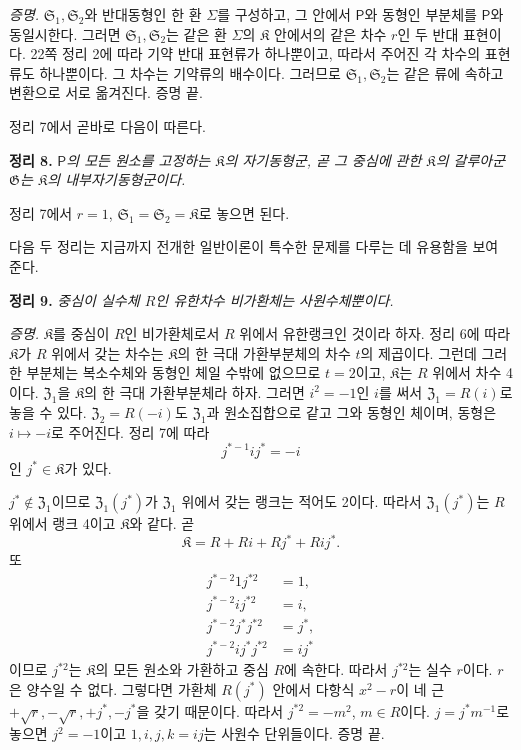 \emph{증명.} \(\mathfrak S_1,\mathfrak S_2\)와 반대동형인 한 환 \(\Sigma\)를 구성하고, 그 안에서 \(\mathsf P\)와 동형인 부분체를 \(\mathsf P\)와 동일시한다. 그러면 \(\mathfrak S_1,\mathfrak S_2\)는 같은 환 \(\Sigma\)의 \(\mathfrak K\) 안에서의 같은 차수 \(r\)인 두 반대 표현이다. 22쪽 정리 2에 따라 기약 반대 표현류가 하나뿐이고, 따라서 주어진 각 차수의 표현류도 하나뿐이다. 그 차수는 기약류의 배수이다. 그러므로 \(\mathfrak S_1,\mathfrak S_2\)는 같은 류에 속하고 변환으로 서로 옮겨진다. 증명 끝.

정리 7에서 곧바로 다음이 따른다.

\textbf{정리 8.} \emph{\(\mathsf P\)의 모든 원소를 고정하는 \(\mathfrak K\)의 자기동형군, 곧 그 중심에 관한 \(\mathfrak K\)의 갈루아군 \(\mathfrak G\)는 \(\mathfrak K\)의 내부자기동형군이다.}

정리 7에서 \(r=1\), \(\mathfrak S_1=\mathfrak S_2=\mathfrak K\)로 놓으면 된다.

다음 두 정리는 지금까지 전개한 일반이론이 특수한 문제를 다루는 데 유용함을 보여 준다.

\textbf{정리 9.} \emph{중심이 실수체 \(R\)인 유한차수 비가환체는 사원수체뿐이다.}

\emph{증명.} \(\mathfrak K\)를 중심이 \(R\)인 비가환체로서 \(R\) 위에서 유한랭크인 것이라 하자. 정리 6에 따라 \(\mathfrak K\)가 \(R\) 위에서 갖는 차수는 \(\mathfrak K\)의 한 극대 가환부분체의 차수 \(t\)의 제곱이다. 그런데 그러한 부분체는 복소수체와 동형인 체일 수밖에 없으므로 \(t=2\)이고, \(\mathfrak K\)는 \(R\) 위에서 차수 4이다. \(\mathfrak Z_1\)을 \(\mathfrak K\)의 한 극대 가환부분체라 하자. 그러면 \(i^2=-1\)인 \(i\)를 써서 \(\mathfrak Z_1=R(i)\)로 놓을 수 있다. \(\mathfrak Z_2=R(-i)\)도 \(\mathfrak Z_1\)과 원소집합으로 같고 그와 동형인 체이며, 동형은 \(i\mapsto-i\)로 주어진다. 정리 7에 따라
\[
        j^{*-1}ij^*=-i
\]
인 \(j^*\in\mathfrak K\)가 있다.

\(j^*\notin\mathfrak Z_1\)이므로 \(\mathfrak Z_1(j^*)\)가 \(\mathfrak Z_1\) 위에서 갖는 랭크는 적어도 2이다. 따라서 \(\mathfrak Z_1(j^*)\)는 \(R\) 위에서 랭크 4이고 \(\mathfrak K\)와 같다. 곧
\[
        \mathfrak K
        =R+Ri+Rj^*+Rij^*.
\]
또
\[
\begin{aligned}
j^{*-2}1j^{*2}&=1,\\
j^{*-2}ij^{*2}&=i,\\
j^{*-2}j^*j^{*2}&=j^*,\\
j^{*-2}ij^*j^{*2}&=ij^*
\end{aligned}
\]
이므로 \(j^{*2}\)는 \(\mathfrak K\)의 모든 원소와 가환하고 중심 \(R\)에 속한다. 따라서 \(j^{*2}\)는 실수 \(r\)이다. \(r\)은 양수일 수 없다. 그렇다면 가환체 \(R(j^*)\) 안에서 다항식 \(x^2-r\)이 네 근 \(+\sqrt r,-\sqrt r,+j^*,-j^*\)을 갖기 때문이다. 따라서 \(j^{*2}=-m^2\), \(m\in R\)이다. \(j=j^*m^{-1}\)로 놓으면 \(j^2=-1\)이고 \(1,i,j,k=ij\)는 사원수 단위들이다. 증명 끝.

